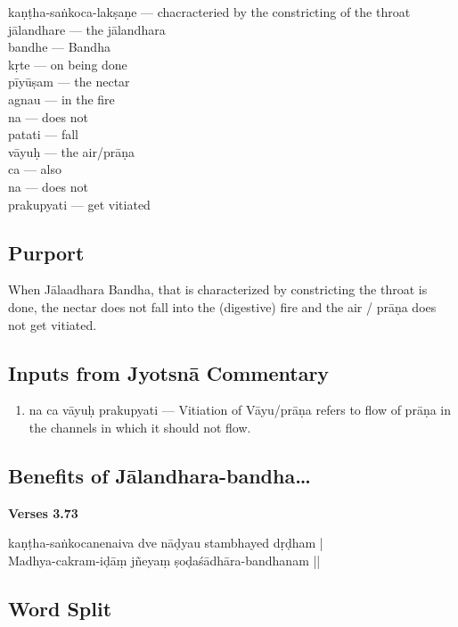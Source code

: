 \begin{multicols}{2}
kaṇṭha-saṅkoca-lakṣaṇe --- chacracteried by the constricting of the throat\\
jālandhare --- the jālandhara \\
bandhe --- Bandha \\
kṛte --- on being done \\
pīyūṣam ---  the nectar \\
agnau --- in the fire \\
na --- does not\\
patati ---  fall\\
vāyuḥ --- the air/prāṇa\\
ca --- also \\
na --- does not \\
prakupyati --- get vitiated
\end{multicols}

\subsection*{Purport}

When Jālaadhara Bandha, that is characterized by constricting the throat is done, the nectar does not fall into the (digestive) fire and the air / prāṇa does not get vitiated.

\subsection*{Inputs from Jyotsnā Commentary}

\begin{enumerate}
\item na ca vāyuḥ prakupyati --- Vitiation of Vāyu/prāṇa refers to flow of prāṇa in the channels in which it should not flow.
\end{enumerate}

\subsection*{Benefits of Jālandhara-bandha…}

\noindent \textbf{Verses 3.73}

\begin{shloka}
kaṇṭha-saṅkocanenaiva dve nāḍyau stambhayed dṛḍham |\\
Madhya-cakram-iḍāṃ jñeyaṃ ṣoḍaśādhāra-bandhanam ||
\end{shloka}

\subsection*{Word Split}

